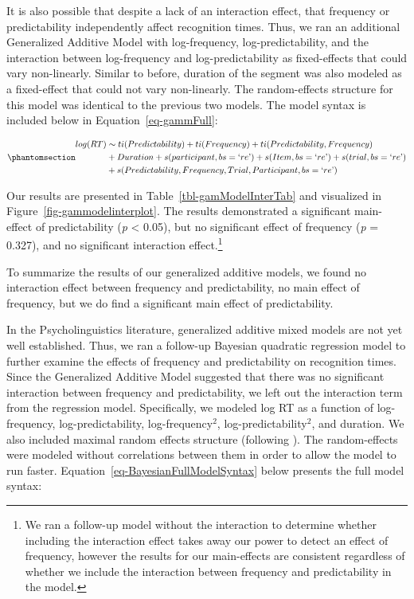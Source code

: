 \documentclass[
  12pt,
  letterpaper,
]{scrreport}
\begin{document}
It is also possible that despite a lack of an interaction effect, that
frequency or predictability independently affect recognition times.
Thus, we ran an additional Generalized Additive Model with
log-frequency, log-predictability, and the interaction between
log-frequency and log-predictability as fixed-effects that could vary
non-linearly. Similar to before, duration of the segment was also
modeled as a fixed-effect that could not vary non-linearly. The
random-effects structure for this model was identical to the previous
two models. The model syntax is included below in
Equation~\ref{eq-gammFull}:

\begin{equation}\phantomsection\label{eq-gammFull}{
\begin{aligned}log(RT) & \sim ti(Predictability) + ti(Frequency) + ti(Predictability, Frequency) \\ & + Duration + s(participant, bs = \text{`}re\text{'}) + s(Item, bs = \text{`}re\text{'})  + s(trial, bs = \text{`}re\text{'}) \\ & + s(Predictability, Frequency, Trial, Participant, bs = \text{`}re\text{'}) \end{aligned}
}\end{equation}

Our results are presented in Table~\ref{tbl-gamModelInterTab} and
visualized in Figure~\ref{fig-gammodelinterplot}. The results
demonstrated a significant main-effect of predictability (\emph{p}
\textless{} 0.05), but no significant effect of frequency (\emph{p} =
0.327), and no significant interaction effect.\footnote{We ran a
  follow-up model without the interaction to determine whether including
  the interaction effect takes away our power to detect an effect of
  frequency, however the results for our main-effects are consistent
  regardless of whether we include the interaction between frequency and
  predictability in the model.}

To summarize the results of our generalized additive models, we found no
interaction effect between frequency and predictability, no main effect
of frequency, but we do find a significant main effect of
predictability.

In the Psycholinguistics literature, generalized additive mixed models
are not yet well established. Thus, we ran a follow-up Bayesian
quadratic regression model to further examine the effects of frequency
and predictability on recognition times. Since the Generalized Additive
Model suggested that there was no significant interaction between
frequency and predictability, we left out the interaction term from the
regression model. Specifically, we modeled log RT as a function of
log-frequency, log-predictability, log-frequency\(^2\),
log-predictability\(^2\), and duration. We also included maximal random
effects structure (following
). The
random-effects were modeled without correlations between them in order
to allow the model to run faster.
Equation~\ref{eq-BayesianFullModelSyntax} below presents the full model
syntax:
\end{document}
